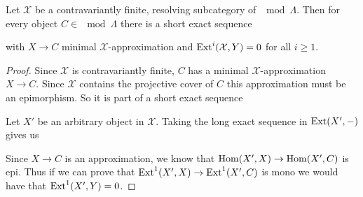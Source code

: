 \begin{lemma} \label{lem:exact_sequence_from_approximation}
	Let $\mathcal X$ be a contravariantly finite, resolving subcategory of $\mod \Lambda$. Then for every object $C \in \mod\Lambda$ there is a short exact sequence 
	\begin{center}
	\end{center}
	with $X\to C$ minimal $\mathcal X$-approximation and $\operatorname{Ext}^i(\mathcal X, Y)=0$ for all $i \geq 1$.
	\begin{proof}
		Since $\mathcal X$ is contravariantly finite, $C$ has a minimal $\mathcal X$-approximation $X \to C$. Since $\mathcal X$ contains the projective cover of $C$ this approximation must be an epimorphism. So it is part of a short exact sequence 
		\begin{center}
		\end{center} 
		Let $X'$ be an arbitrary object in $\mathcal X$. Taking the long exact sequence in $\operatorname{Ext}(X', -)$ gives us
		\begin{center}
		\end{center}
		Since $X \to C$ is an approximation, we know that $\operatorname{Hom}(X', X) \to \operatorname{Hom}(X', C)$ is epi. Thus if we can prove that $\operatorname{Ext}^1(X', X) \to \operatorname{Ext}^1(X', C)$ is mono we would have that $\operatorname{Ext}^1(X', Y)=0$. 
		

\end{proof}
\end{lemma}
